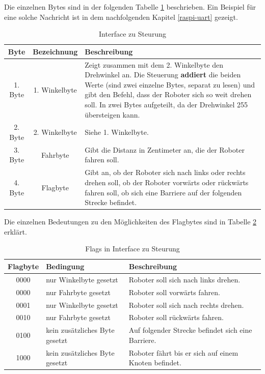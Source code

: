 Die einzelnen Bytes sind in der folgenden Tabelle \ref{table:interface-to-tiny} beschrieben. Ein Beispiel für eine solche Nachricht ist in dem nachfolgenden Kapitel \ref{raspi-uart} gezeigt.

\begin{table}[H]
\centering
\small
\begin{tabularx}{\textwidth}{|c|c|X|}
\hline
  \textbf{Byte} &\textbf{Bezeichnung} & \textbf{Beschreibung}\\
  \hline
      1. Byte&1. Winkelbyte &Zeigt zusammen mit dem 2. Winkelbyte den Drehwinkel an. Die Steuerung \textbf{addiert} die beiden Werte (sind zwei einzelne Bytes, separat zu lesen) und gibt den Befehl, dass der Roboter sich so weit drehen soll. In zwei Bytes aufgeteilt, da der Drehwinkel 255 übersteigen kann.\\
  \hline
2. Byte&2. Winkelbyte&Siehe 1. Winkelbyte.\\
  \hline
  3. Byte&Fahrbyte&Gibt die Distanz in Zentimeter an, die der Roboter fahren soll.\\
  \hline
  4. Byte&Flagbyte&Gibt an, ob der Roboter sich nach links oder rechts drehen soll, ob der Roboter vorwärts oder rückwärts fahren soll, ob sich eine Barriere auf der folgenden Strecke befindet.\\
  \hline
  \end{tabularx}
\caption{Interface zu Steurung}
\label{table:interface-to-tiny}
\end{table}

Die einzelnen Bedeutungen zu den Möglichkeiten des Flagbytes sind in Tabelle \ref{table:flag-to-tiny} erklärt.

\begin{table}[H]
\centering
\small
\begin{tabularx}{\textwidth}{|c|X|X|}
\hline
  \textbf{Flagbyte} & \textbf{Bedingung} & \textbf{Beschreibung}\\
  \hline
      0000&nur Winkelbyte gesetzt&Roboter soll sich nach links drehen.\\
  \hline
        0000&nur Fahrbyte gesetzt&Roboter soll vorwärts fahren.\\
  \hline
0001&nur Winkelbyte gesetzt&Roboter soll sich nach rechts drehen.\\
  \hline

0010&nur Fahrbyte gesetzt&Roboter soll rückwärts fahren.\\
  \hline

0100&kein zusätzliches Byte gesetzt&Auf folgender Strecke befindet sich eine Barriere.\\
  \hline
1000&kein zusätzliches Byte gesetzt&Roboter fährt bis er sich auf einem Knoten befindet.\\
  \hline
  \end{tabularx}
\caption{Flags in Interface zu Steurung}
\label{table:flag-to-tiny}
\end{table}



